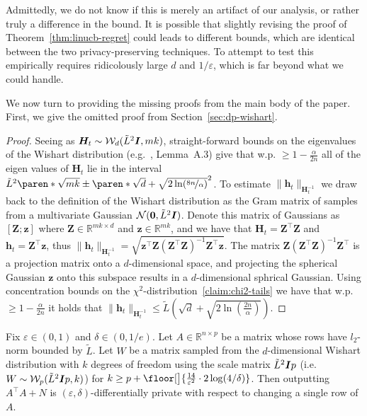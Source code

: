 \documentclass{article}
\renewcommand{\vec}[1]{\bm{#1}}
\newcommand{\Real}{\mathds{R}}
\DeclarePairedDelimiter{\paren}()
\DeclarePairedDelimiter{\floor}\lfloor\rfloor
\providecommand\transp{\top}
\let\transpsymbol\transp
\renewcommand{\transp}[1]{#1^\transpsymbol}
\newcommand{\Wishart}{\mathcal{W}}
\newcommand{\Normal}{\mathcal{N}}
\newcommand{\Eye}[1][]{\bm{I}\notblank{#1}{_{{#1}\times{#1}}}{}}
\newcommand{\XtX}[1]{\transp{#1}{#1}}
\begin{document}
Admittedly, we do not know if this is merely an artifact of our analysis, or rather truly a difference in the bound. It is possible that slightly revising the proof of Theorem~\ref{thm:linucb-regret} could leads to different bounds, which are identical between the two privacy-preserving techniques. To attempt to test this empirically requires ridicolously large $d$ and $1/\varepsilon$, which is far beyond what we could handle.

We now turn to providing the missing proofs from the main body of the paper. First, we give the omitted proof from Section~\ref{sec:dp-wishart}.

\PropWishartTails*
\begin{proof}
Seeing as $\vec H_t\sim\Wishart_d(\tilde L^2 \Eye, mk)$, straight-forward bounds on the eigenvalues of the Wishart distribution (e.g.~\cite{SheffetPrivateApproxRegression2015}, Lemma~A.3) give that w.p. $\geq 1- \tfrac \alpha{2n}$ all of the eigen values of $\vec H_t$ lie in the interval $\tilde L^2 \paren*{\sqrt{mk} \pm \paren*{\sqrt{d} + \sqrt{2\ln(\nicefrac{8n}{\alpha})}}}^2$. To estimate $\|\vec h_t\|_{\vec H_t^{-1}}$ we draw back to the definition of the Wishart distribution as the Gram matrix of samples from a multivariate Gaussian $\Normal(\vec 0, \tilde L^2\Eye)$. Denote this matrix of Gaussians as $[\vec Z ; \vec z]$ where $\vec Z\in \Real^{mk\times d}$ and $\vec z \in \Real^{mk}$, and we have that $\vec H_t = \transp{\vec Z} \vec Z$ and $\vec h_t = \transp{\vec Z} \vec z$, thus $\|\vec h_t\|_{\vec H_t^{-1}} = \sqrt{ \transp{\vec z} \vec Z (\transp{\vec  Z} \vec Z)^{-1}  \transp{\vec Z} \vec z }$. The matrix $\vec Z (\transp{\vec Z} \vec Z)^{-1}  \transp{\vec Z}$ is a projection matrix onto a $d$-dimensional space, and projecting the spherical Gaussian $\vec z$ onto this subspace results in a $d$-dimensional sphrical Gaussian. Using concentration bounds on the $\chi^2$-distribution~\ref{claim:chi2-tails} we have that w.p. $\geq 1- \tfrac \alpha{2n}$ it holds that $\|\vec h_t\|_{\vec H_t^{-1}}\leq \tilde L(\sqrt{d} + \sqrt{2\ln(\tfrac{2n}{\alpha})})$. %
\end{proof}

\begin{theorem}%
  \label{thm:wishart-dp}%
  Fix $\varepsilon\in(0,1)$ and $\delta\in(0,1/e)$.  Let
  $A\in\Real^{n\times p}$ be a matrix whose rows have $l_2$-norm
  bounded by $\tilde L$.  Let $W$ be a matrix sampled from the
  $d$-dimensional Wishart distribution with $k$ degrees of freedom
  using the scale matrix $\tilde L^2\Eye{p}$ (i.e.\
  $W \sim \Wishart_p(\tilde L^2\Eye{p}, k)$) for
  $k \ge p + \floor[\big]{\frac{14}{\varepsilon^2}\cdot 2\log(4/\delta)}$.
  Then outputting $\XtX{A} + N$ is
  $(\varepsilon,\delta)$-differentially private with respect to
  changing a single row of $A$.
\end{theorem}
\end{document}
